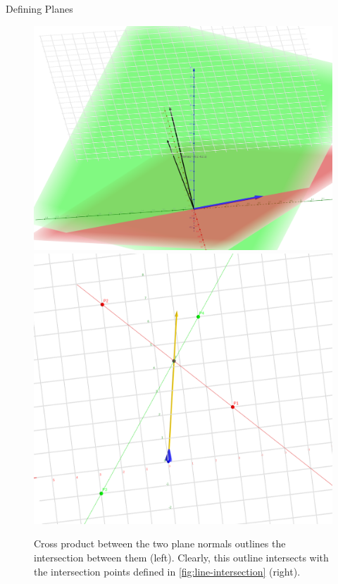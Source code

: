 \documentclass[twocolumn]{article}
\begin{document}
\begin{section}{Defining Planes}
      \begin{figure}
        \centering
        \includegraphics[width=0.49\linewidth]{./res/6.png}
        \includegraphics[width=0.49\linewidth]{./res/7.png}
        \caption{Cross product between the two plane normals outlines the
intersection between them (left). Clearly, this outline intersects with the
intersection points defined in \cref{fig:line-intersection} (right).}
        \label{fig:perpendicular}
      \end{figure}

    \end{section}
\end{document}
